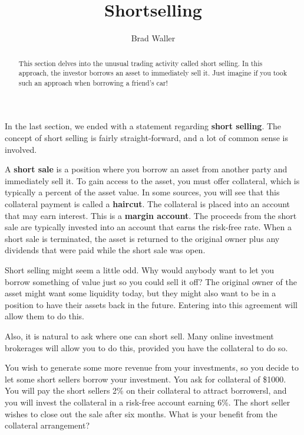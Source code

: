 \documentclass{ximera}
\author{Brad Waller}
\title{Shortselling}
\begin{document}
\begin{abstract}
This section delves into the unusual trading activity called short selling. In this approach, the investor borrows an asset to immediately sell it. Just imagine if you took such an approach when borrowing a friend's car!
\end{abstract}

\maketitle

In the last section, we ended with a statement regarding {\bf short selling}. The concept of short selling is fairly straight-forward, and a lot of common sense is involved. 

\begin{definition}\label{def{40}}
A {\bf short sale} is a position where you borrow an asset from another party and immediately sell it. To gain access to the asset, you must offer collateral, which is typically a percent of the asset value. In some sources, you will see that this collateral payment is called a {\bf haircut}. The collateral is placed into an account that may earn interest. This is a {\bf margin account}. The proceeds from the short sale are typically invested into an account that earns the risk-free rate. When a short sale is terminated, the asset is returned to the original owner plus any dividends that were paid while the short sale was open. 
\end{definition}

\begin{remark}
Short selling might seem a little odd. Why would anybody want to let you borrow something of value just so you could sell it off? The original owner of the asset might want some liquidity today, but they might also want to be in a position to have their assets back in the future. Entering into this agreement will allow them to do this.

Also, it is natural to ask where one can short sell. Many online investment brokerages will allow you to do this, provided you have the collateral to do so.
\end{remark}

\begin{example}
You wish to generate some more revenue from your investments, so you decide to let some short sellers borrow your investment. You ask for collateral of \$1000. You will pay the short sellers 2\% on their collateral to attract borrowersl, and you will invest the collateral in a risk-free account earning 6\%. The short seller wishes to close out the sale after six months. What is your benefit from the collateral arrangement?
\end{example}
\end{document}
